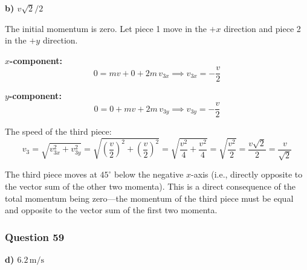 \documentclass[12pt,letterpaper]{article}
\begin{document}
\begin{answerbox}
\textbf{b) $v\sqrt{2}/2$}
\end{answerbox}

\begin{explanationbox}
The initial momentum is zero. Let piece 1 move in the $+x$ direction and piece 2 in the $+y$ direction.

\textbf{$x$-component:}
\[
0 = mv + 0 + 2m\,v_{3x} \implies v_{3x} = -\frac{v}{2}
\]

\textbf{$y$-component:}
\[
0 = 0 + mv + 2m\,v_{3y} \implies v_{3y} = -\frac{v}{2}
\]

The speed of the third piece:
\[
v_3 = \sqrt{v_{3x}^2 + v_{3y}^2} = \sqrt{\left(\frac{v}{2}\right)^2 + \left(\frac{v}{2}\right)^2} = \sqrt{\frac{v^2}{4} + \frac{v^2}{4}} = \sqrt{\frac{v^2}{2}} = \frac{v\sqrt{2}}{2} = \frac{v}{\sqrt{2}}
\]

The third piece moves at $45^\circ$ below the negative $x$-axis (i.e., directly opposite to the vector sum of the other two momenta). This is a direct consequence of the total momentum being zero---the momentum of the third piece must be equal and opposite to the vector sum of the first two momenta.
\end{explanationbox}

\subsubsection*{Question 59}

\begin{answerbox}
\textbf{d) $6.2\,\text{m/s}$}
\end{answerbox}
\end{document}
